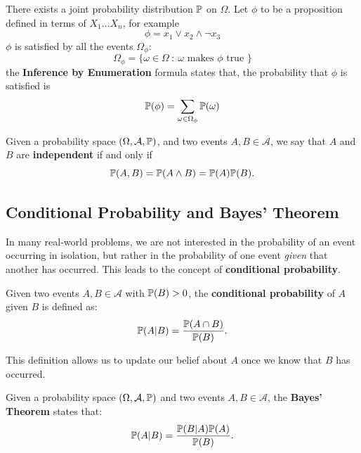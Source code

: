 \documentclass[10pt, letterpaper]{report}
\begin{document}
There exists a joint probability distribution ${\mathbb P}$ on $\Omega$. Let $\phi$ to be a proposition defined in terms of $X_1\dots X_n$, for example
\begin{equation}
	\phi=x_1\lor x_2 \land \lnot x_3
\end{equation}
$\phi$ is satisfied by all the events $\Omega_\phi$:
\begin{equation}
	\Omega_\phi=\{\omega\in \Omega \ : \ \omega \text{ makes } \phi \text{ true }\}
\end{equation}
the \textbf{Inference by Enumeration} formula states that, the probability that $\phi$ is satisfied is
\begin{equation}
	{\mathbb P}(\phi)=\sum_{\omega\in  \Omega_\phi}{\mathbb P}(\omega)
\end{equation}

\begin{definition}
	Given a probability space $(\Omega,\mathcal A,{\mathbb P})$, and two events $A,B\in\mathcal A$, we say that $A$ and $B$ are \textbf{independent} if and only if
	\begin{equation}
		{\mathbb P}(A, B)={\mathbb P}(A\land B)={\mathbb P}(A){\mathbb P}(B).
	\end{equation}
\end{definition}

\subsection{Conditional Probability and Bayes' Theorem}

In many real-world problems, we are not interested in the probability of an event occurring in isolation, but rather in the probability of one event \emph{given} that another has occurred.
This leads to the concept of \textbf{conditional probability}.

\begin{definition}
	Given two events $A,B \in \mathcal A$ with ${\mathbb P}(B) > 0$, the \textbf{conditional probability} of $A$ given $B$ is defined as:
	\begin{equation}
		{\mathbb P}(A|B) = \frac{{\mathbb P}(A \cap B)}{{\mathbb P}(B)}.
	\end{equation}
\end{definition}

This definition allows us to update our belief about $A$ once we know that $B$ has occurred.

\bigskip
\begin{theorem}
	Given a probability space $(\Omega,\mathcal A,{\mathbb P})$ and two events $A,B\in\mathcal A$, the \textbf{Bayes' Theorem} states that:
	\begin{equation}
		{\mathbb P}(A|B) = \frac{{\mathbb P}(B|A){\mathbb P}(A)}{{\mathbb P}(B)}.
	\end{equation}
\end{theorem}
\end{document}
